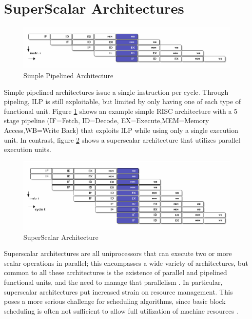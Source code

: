 \documentclass[12pt]{report}
\begin{document}
\section{SuperScalar Architectures}
\label{sec:orga79952a}

\begin{figure}[htbp]
\centering
\includegraphics[width=1.0\textwidth]{figures/RISCPipeline.png}
\caption{\label{fig:PipelinedArchitecture}
Simple Pipelined Architecture}
\end{figure}


Simple pipelined architectures issue a single instruction per cycle.
Through pipeling, ILP is still exploitable, but limited by only having one of
each type of functional unit. Figure \ref{fig:PipelinedArchitecture} shows an
example simple RISC architecture with a 5 stage pipeline (IF=Fetch,
ID=Decode, EX=Execute,MEM=Memory Access,WB=Write Back) that exploits ILP while using only a single
execution unit. In contrast, figure \ref{fig:SuperScalarArchitecture} shows a
superscalar architecture that utilizes parallel execution units.  

\begin{figure}[htbp]
\centering
\includegraphics[width=1.0\textwidth]{figures/SuperScalarPipeline.png}
\caption{\label{fig:SuperScalarArchitecture}
SuperScalar Architecture}
\end{figure}


Superscalar architectures are all uniprocessors that can execute two or more
scalar operations in parallel; this encompasses a wide variety of
architectures, but common to all these architectures is the existence of
parallel and pipelined functional units, and the need to manage that
parallelism \parencite{zyuban2001inherently}. In particular, superscalar
architectures put increased strain on resource management. This poses a more
serious challenge for scheduling algorithms, since basic block scheduling is
often not sufficient to allow full utilization of machine
resources \parencite{bernstein1991global}. 
\end{document}
